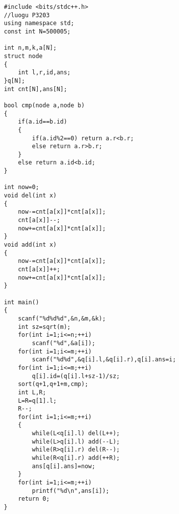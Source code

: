 \begin{lstlisting}
#include <bits/stdc++.h>
//luogu P3203
using namespace std;
const int N=500005;

int n,m,k,a[N];
struct node
{
	int l,r,id,ans;
}q[N];
int cnt[N],ans[N];

bool cmp(node a,node b)
{
	if(a.id==b.id)
	{
		if(a.id%2==0) return a.r<b.r;
		else return a.r>b.r;
	}
	else return a.id<b.id;
}

int now=0;
void del(int x)
{
	now-=cnt[a[x]]*cnt[a[x]];
	cnt[a[x]]--;
	now+=cnt[a[x]]*cnt[a[x]];
}
void add(int x)
{
	now-=cnt[a[x]]*cnt[a[x]];
	cnt[a[x]]++;
	now+=cnt[a[x]]*cnt[a[x]];
}

int main()
{
	scanf("%d%d%d",&n,&m,&k);
	int sz=sqrt(m);
	for(int i=1;i<=n;++i)
		scanf("%d",&a[i]);
	for(int i=1;i<=m;++i)
		scanf("%d%d",&q[i].l,&q[i].r),q[i].ans=i;
	for(int i=1;i<=m;++i)
		q[i].id=(q[i].l+sz-1)/sz;
	sort(q+1,q+1+m,cmp);
	int L,R;
	L=R=q[1].l;
	R--;
	for(int i=1;i<=m;++i)
	{
		while(L<q[i].l) del(L++);
		while(L>q[i].l) add(--L);
		while(R>q[i].r) del(R--);
		while(R<q[i].r) add(++R);
		ans[q[i].ans]=now;
	}
	for(int i=1;i<=m;++i)
		printf("%d\n",ans[i]);
	return 0;
}
\end{lstlisting}